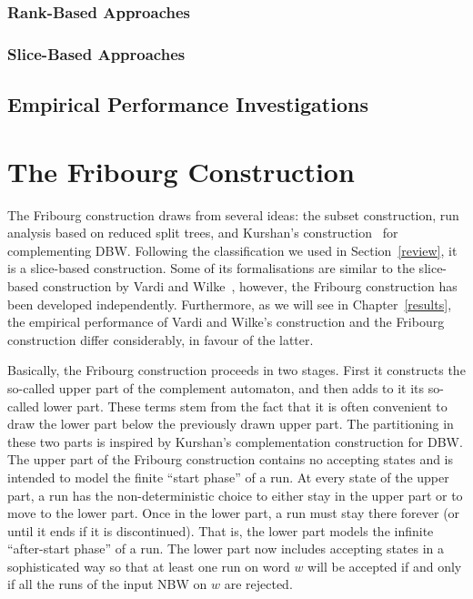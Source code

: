\documentclass[a4paper]{report}
\begin{document}
\subsection{Rank-Based Approaches}
\label{rank-based}
\subsection{Slice-Based Approaches}
\label{slice-based}

\section{Empirical Performance Investigations}

\chapter{The Fribourg Construction}
\label{fribourg_construction}
The Fribourg construction draws from several ideas: the subset construction, run analysis based on reduced split trees, and Kurshan's construction~\cite{Kurshan198759} for complementing DBW. Following the classification we used in Section~\ref{review}, it is a slice-based construction. Some of its formalisations are similar to the slice-based construction by Vardi and Wilke~\cite{vardi2007automata}, however, the Fribourg construction has been developed independently. Furthermore, as we will see in Chapter~\ref{results}, the empirical performance of Vardi and Wilke's construction and the Fribourg construction differ considerably, in favour of the latter.

Basically, the Fribourg construction proceeds in two stages. First it constructs the so-called upper part of the complement automaton, and then adds to it its so-called lower part. These terms stem from the fact that it is often convenient to draw the lower part below the previously drawn upper part. The partitioning in these two parts is inspired by Kurshan's complementation construction for DBW. The upper part of the Fribourg construction contains no accepting states and is intended to model the finite ``start phase'' of a run. At every state of the upper part, a run has the non-deterministic choice to either stay in the upper part or to move to the lower part. Once in the lower part, a run must stay there forever (or until it ends if it is discontinued). That is, the lower part models the infinite ``after-start phase'' of a run. The lower part now includes accepting states in a sophisticated way so that at least one run on word $w$ will be accepted if and only if all the runs of the input NBW on $w$ are rejected.
\end{document}
